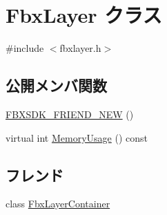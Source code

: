 \hypertarget{class_fbx_layer}{}\section{Fbx\+Layer クラス}
\label{class_fbx_layer}


{\ttfamily \#include $<$fbxlayer.\+h$>$}

\subsection*{公開メンバ関数}
\begin{DoxyCompactItemize}
\item 
\hyperlink{class_fbx_layer_aef0025e8973e9d11b79ff7f7f9388963}{F\+B\+X\+S\+D\+K\+\_\+\+F\+R\+I\+E\+N\+D\+\_\+\+N\+EW} ()
\item 
virtual int \hyperlink{class_fbx_layer_a7408d4032e3aa5f880ccc58e4956fd6c}{Memory\+Usage} () const
\end{DoxyCompactItemize}
\subsection*{フレンド}
\begin{DoxyCompactItemize}
\item 
class \hyperlink{class_fbx_layer_a791d2046ce60bf6f5fb85d9dc6242f2e}{Fbx\+Layer\+Container}
\end{DoxyCompactItemize}
